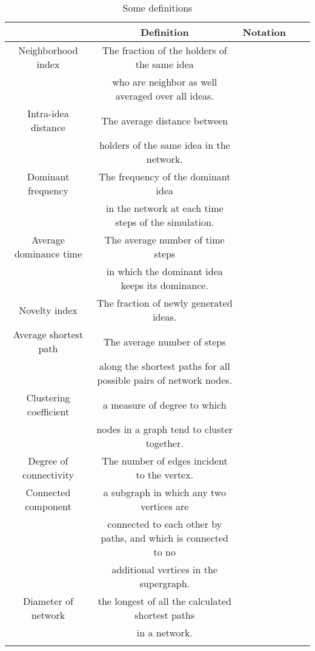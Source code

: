 \begin{table}[ht]
\caption{Some definitions} %
\centering %
\begin{tabular}{c c c c c} %
\hline\hline %
 & Definition & Notation\\ [0.5ex] %
\hline %
Neighborhood index & The fraction of the holders of the same idea\\
\,&  who are neighbor as well averaged over all ideas.\\
\hline
Intra-idea distance& The average distance between \\
&holders of the same idea in the network.\\
\hline
Dominant frequency & The frequency of the dominant idea\\
& in the network at each time steps of the
simulation.\\
\hline
Average dominance time& The average number of time steps \\
&in which the dominant idea keeps its
dominance.\\
\hline
Novelty index& The fraction of newly generated ideas.\\
\hline
Average shortest path & The average number of steps\\
& along the shortest paths for all possible pairs of network nodes.\\
\hline
Clustering coefficient &  a measure of degree to which\\
& nodes in a graph tend to cluster together.\\
\hline
Degree of connectivity &  The number of edges incident to the vertex.\\
\hline
Connected component & a subgraph in which any two vertices are\\
 &connected to each other by paths, and which is connected to no\\
  &additional vertices in the supergraph.\\
\hline
Diameter of network& the longest of all the calculated shortest paths\\
& in a network.\\
\\ [1ex] %
\hline %
\end{tabular}
\label{Tab2} %
\end{table}

